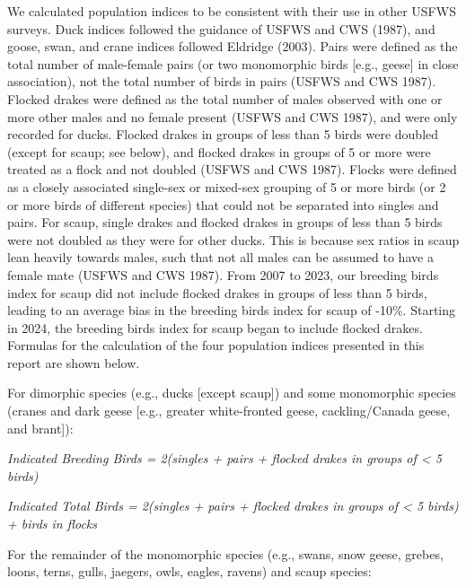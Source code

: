 \documentclass[
]{article}
\begin{document}
We calculated population indices to be consistent with their use in
other USFWS surveys. Duck indices followed the guidance of USFWS and CWS
(1987), and goose, swan, and crane indices followed Eldridge (2003).
Pairs were defined as the total number of male-female pairs (or two
monomorphic birds {[}e.g., geese{]} in close association), not the total
number of birds in pairs (USFWS and CWS 1987). Flocked drakes were
defined as the total number of males observed with one or more other
males and no female present (USFWS and CWS 1987), and were only recorded
for ducks. Flocked drakes in groups of less than 5 birds were doubled
(except for scaup; see below), and flocked drakes in groups of 5 or more
were treated as a flock and not doubled (USFWS and CWS 1987). Flocks
were defined as a closely associated single-sex or mixed-sex grouping of
5 or more birds (or 2 or more birds of different species) that could not
be separated into singles and pairs. For scaup, single drakes and
flocked drakes in groups of less than 5 birds were not doubled as they
were for other ducks. This is because sex ratios in scaup lean heavily
towards males, such that not all males can be assumed to have a female
mate (USFWS and CWS 1987). From 2007 to 2023, our breeding birds index
for scaup did not include flocked drakes in groups of less than 5 birds,
leading to an average bias in the breeding birds index for scaup of
-10\%. Starting in 2024, the breeding birds index for scaup began to
include flocked drakes. Formulas for the calculation of the four
population indices presented in this report are shown below.

For dimorphic species (e.g., ducks {[}except scaup{]}) and some
monomorphic species (cranes and dark geese {[}e.g., greater
white-fronted geese, cackling/Canada geese, and brant{]}):

\begin{center}

\textit{Indicated Breeding Birds = 2(singles + pairs + flocked drakes in groups of < 5 birds)} \newline

\textit{Indicated Total Birds = 2(singles + pairs + flocked drakes in groups of < 5 birds) + birds in flocks} \newline

\end{center}

For the remainder of the monomorphic species (e.g., swans, snow geese, grebes, loons, terns, gulls, jaegers, owls, eagles, ravens) and scaup species:\newline
\end{document}
